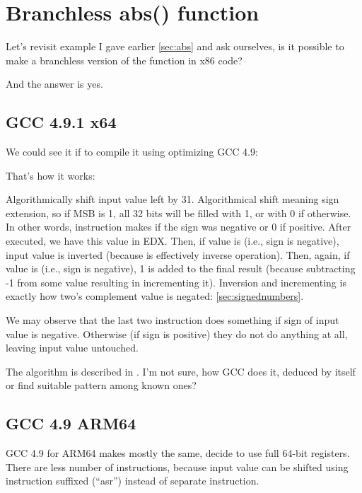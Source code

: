 \ifdefined\RUSSIAN
\else

\chapter{Branchless abs() function}
\label{chap:branchless_abs}

Let's revisit example I gave earlier \ref{sec:abs} and ask ourselves, is it possible
to make a branchless version of the function in x86 code?



And the answer is yes.

\section{\Optimizing GCC 4.9.1 x64}

We could see it if to compile it using optimizing GCC 4.9:



That's how it works:

Algorithmically shift input value left by 31. 
Algorithmical shift meaning sign extension, so if \ac{MSB} is 1, all 32 bits will be filled with 1, or with 0
if otherwise.
In other words,  instruction makes  if the sign was negative or 0 if positive.
After  executed, we have this value in EDX.
Then, if value is  (i.e., sign is negative), input value is inverted 
(because  is effectively inverse operation).
Then, again, if value is  (i.e., sign is negative), 1 is added to the final result (because
subtracting -1 from some value resulting in incrementing it).
Inversion and incrementing is exactly how two's complement value is negated: \ref{sec:signednumbers}.

We may observe that the last two instruction does something if sign of input value is negative.
Otherwise (if sign is positive) they do not do anything at all, leaving input value untouched.

The algorithm is described in \cite[2-4]{Warren:2002:HD:515297}.
I'm not sure, how GCC does it, deduced by itself or find suitable pattern among known ones?

\section{\Optimizing GCC 4.9 ARM64}

GCC 4.9 for ARM64 makes mostly the same, decide to use full 64-bit registers.
There are less number of instructions, because input value can be shifted using instruction suffixed (``asr'')
instead of separate instruction.



\fi